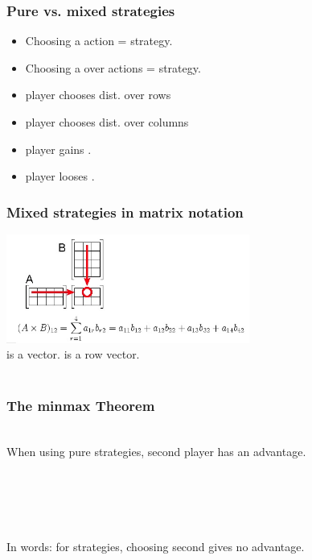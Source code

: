 \documentclass[handout]{beamer}
\begin{document}
\begin{frame}
\frametitle{Pure vs. mixed strategies}
\begin{itemize}
\item Choosing a  action =  strategy.
\item Choosing a  over actions =  strategy.
\item {} player chooses dist. over rows \R{$\P$}
\item {} player chooses dist. over columns \R{$\Q$}
\item {} player gains \R{$\M(\P,\Q)$}.
\item {} player looses \R{$\M(\P,\Q)$}.
\end{itemize}
\end{frame}

\begin{frame}
\frametitle{Mixed strategies in matrix notation}
\includegraphics[width=8cm]{figures/matrixProduct.jpg}
\pause \\
\R{$\Q$} is a  vector.  is a row vector.
\pause \\ ~\\
\end{frame}

\begin{frame}
  \frametitle{The minmax Theorem}
~\\
When using pure strategies, second player has an advantage.
~\\~\\ ~\pause
{}
\\ ~ \\ 
\R{\[ \minp \maxq \mpq = \maxq \minp \mpq \]}
\\ ~ \\ 
In words: for  strategies, choosing second gives no advantage.
\end{frame}
\end{document}
